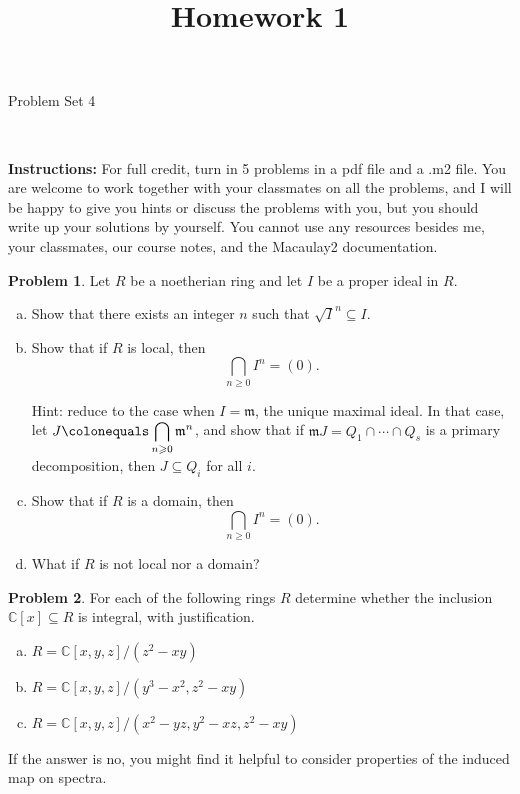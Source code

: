 \documentclass[11pt]{article}
\title{}
\date{\vspace{-0.5in}}
\title{Homework 1}
\newcommand{\m}{\mathfrak{m}}
\newcommand{\C}{\mathbb{C}}
\theoremstyle{definition}
\newtheorem{problem}{Problem}
\begin{document}
\thispagestyle{fancy}
\pagestyle{fancy}

\vspace{3em}

\begin{center}
	{\LARGE Problem Set 4}
\end{center}

\

\noindent
{\bf Instructions:}
For full credit, turn in 5 problems in a pdf file and a .m2 file. 
You are welcome to work together with your classmates on all the problems, and I will be happy to give you hints or discuss the problems with you, but you should write up your solutions by yourself.
You cannot use any resources besides me, your classmates, our course notes, and the Macaulay2 documentation.


\vspace{2em}


\begin{problem}
	Let $R$ be a noetherian ring and let $I$ be a proper ideal in $R$.
	\begin{enumerate}[a)]
		\item Show that there exists an integer $n$ such that $\sqrt{I}^n \subseteq I$.
		\item Show that if $R$ is local, then
		$$\bigcap_{n \geqslant 0} I^n = (0).$$
		
		\noindent
		Hint: reduce to the case when $I = \m$, the unique maximal ideal. In that case, let $J \colonequals \displaystyle\bigcap_{n\geqslant 0} \m^n$, and show that if $\m J = Q_1 \cap \cdots \cap Q_s$ is a primary decomposition, then $J \subseteq Q_i$ for all $i$.
		
		\item Show that if $R$ is a domain, then
		$$\bigcap_{n \geqslant 0} I^n = (0).$$
		\item What if $R$ is not local nor a domain?
	\end{enumerate}
\end{problem}



\vfill



\begin{problem}
For each of the following rings $R$ determine whether the inclusion $\C[x] \subseteq R$ is integral, with justification. 
\begin{enumerate}[a)]
\item $R=\C[x,y,z]/(z^2-xy)$
\item $R=\C[x,y,z]/(y^3-x^2, z^2-xy)$
\item $R=\C[x,y,z]/(x^2-yz, y^2-xz, z^2-xy)$
\end{enumerate}
If the answer is no, you might find it helpful to consider properties of the induced map on spectra.
\end{problem}
\end{document}
